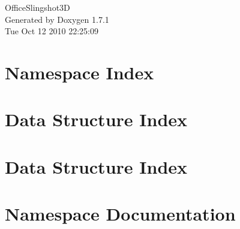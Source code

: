 \documentclass[a4paper]{book}
\begin{document}
\hypersetup{pageanchor=false}
\begin{titlepage}
\vspace*{7cm}
\begin{center}
{\Large OfficeSlingshot3D }\\
\vspace*{1cm}
{\large Generated by Doxygen 1.7.1}\\
\vspace*{0.5cm}
{\small Tue Oct 12 2010 22:25:09}\\
\end{center}
\end{titlepage}
\clearemptydoublepage
{}
\tableofcontents
\clearemptydoublepage
{}
\hypersetup{pageanchor=true}
\chapter{Namespace Index}

\chapter{Data Structure Index}

\chapter{Data Structure Index}

\chapter{Namespace Documentation}





\end{document}
